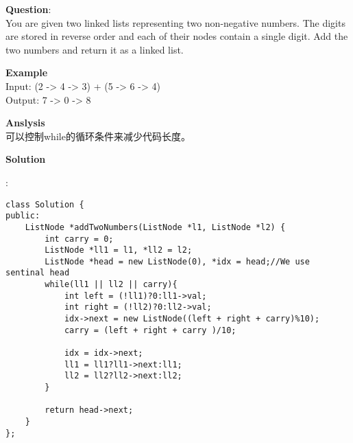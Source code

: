     
\begin{description}
    \item{\textbf{Question}}:\\%
		You are given two linked lists representing two non-negative numbers. The digits are stored in reverse order and each of their nodes contain a single digit. Add the two numbers and return it as a linked list.\\

    \item{\textbf{Example}}\\
		Input: (2 -> 4 -> 3) + (5 -> 6 -> 4)\\
		Output: 7 -> 0 -> 8\\

    \item{\textbf{Anslysis}}\\
		可以控制while的循环条件来减少代码长度。\\

    \item{\textbf{Solution}}
	\item{} : \\
		\begin{lstlisting}
class Solution {
public:
    ListNode *addTwoNumbers(ListNode *l1, ListNode *l2) {
    	int carry = 0;
    	ListNode *ll1 = l1, *ll2 = l2;
    	ListNode *head = new ListNode(0), *idx = head;//We use sentinal head
    	while(ll1 || ll2 || carry){
    		int left = (!ll1)?0:ll1->val;
    		int right = (!ll2)?0:ll2->val;
    		idx->next = new ListNode((left + right + carry)%10);
    		carry = (left + right + carry )/10;
    
    		idx = idx->next;
    		ll1 = ll1?ll1->next:ll1;
    		ll2 = ll2?ll2->next:ll2;
    	}	

    	return head->next;
    }
};
		\end{lstlisting}
\end{description}

